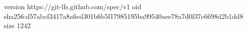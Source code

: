 version https://git-lfs.github.com/spec/v1
oid sha256:d57abcf3417a8a6cd301b6b5f17985195ba99540aee78a7d0f37c6698d2b1dd8
size 1242
